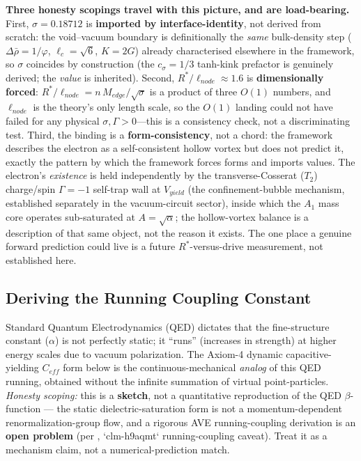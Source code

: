 \textbf{Three honesty scopings travel with this picture, and are load-bearing.} First, $\sigma = 0.18712$ is \textbf{imported by interface-identity}, not derived from scratch: the void--vacuum boundary is definitionally the \emph{same} bulk-density step ($\Delta\bar\rho = 1/\varphi$, $\ell_c = \sqrt6$, $K = 2G$) already characterised elsewhere in the framework, so $\sigma$ coincides by construction (the $c_\sigma = 1/3$ tanh-kink prefactor is genuinely derived; the \emph{value} is inherited). Second, $R^{*}/\ell_{node} \approx 1.6$ is \textbf{dimensionally forced}: $R^{*}/\ell_{node} = n\,M_{edge}/\sqrt{\sigma}$ is a product of three $O(1)$ numbers, and $\ell_{node}$ is the theory's only length scale, so the $O(1)$ landing could not have failed for any physical $\sigma, \Gamma > 0$---this is a consistency check, not a discriminating test. Third, the binding is a \textbf{form-consistency}, not a chord: the framework describes the electron as a self-consistent hollow vortex but does not predict it, exactly the pattern by which the framework forces forms and imports values. The electron's \emph{existence} is held independently by the transverse-Cosserat ($T_2$) charge/spin $\Gamma = -1$\gammaundeclared{} self-trap wall at $V_{yield}$ (the confinement-bubble mechanism, established separately in the vacuum-circuit sector), inside which the $A_1$ mass core operates sub-saturated at $A = \sqrt{\alpha}$; the hollow-vortex balance is a description of that same object, not the reason it exists. The one place a genuine forward prediction could live is a future $R^{*}$-versus-drive measurement, not established here.

\subsection{Deriving the Running Coupling Constant}
Standard Quantum Electrodynamics (QED) dictates that the fine-structure constant ($\alpha$) is not perfectly static; it ``runs'' (increases in strength) at higher energy scales due to vacuum polarization. The Axiom-4 dynamic capacitive-yielding $C_{eff}$ form below is the continuous-mechanical \emph{analog} of this QED running, obtained without the infinite summation of virtual point-particles. \emph{Honesty scoping:} this is a \textbf{sketch}, not a quantitative reproduction of the QED $\beta$-function --- the static dielectric-saturation form is not a momentum-dependent renormalization-group flow, and a rigorous AVE running-coupling derivation is an \textbf{open problem} (per , `clm-h9aqmt` running-coupling caveat). Treat it as a mechanism claim, not a numerical-prediction match.

